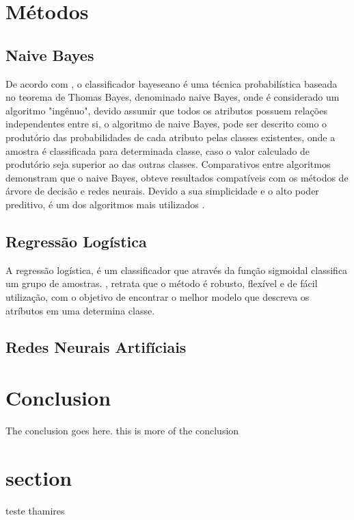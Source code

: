 \documentclass[10pt, conference, compsocconf]{IEEEtran}
\begin{document}
\section{Métodos}\label{metodos}
\subsection{Naive Bayes}
De acordo com \cite{4}, o classificador bayeseano é uma técnica probabilística baseada no teorema de Thomas Bayes, denominado naive Bayes, onde é considerado um algoritmo "ingênuo", devido assumir que todos os atributos possuem relações independentes entre si, o algoritmo de naive Bayes, pode ser descrito como o produtório das probabilidades de cada atributo pelas classes existentes, onde a amostra é classificada para determinada classe, caso o valor calculado de produtório seja superior ao das outras classes. Comparativos entre algoritmos demonstram que o naive Bayes, obteve resultados compatíveis com os métodos de árvore de decisão e redes neurais. Devido a sua simplicidade e o alto poder preditivo, é um dos algoritmos mais utilizados \cite{5}.
 
\subsection{Regressão Logística}
A regressão logística, é um classificador que através da função sigmoidal classifica um grupo de amostras. \cite{6}, retrata que o método é robusto, flexível e de fácil utilização, com o objetivo de encontrar o melhor modelo que descreva os atríbutos em uma determina classe.

\subsection{Redes Neurais Artifíciais}


\section{Conclusion}
The conclusion goes here. this is more of the conclusion


\section{section}
teste thamires

%


\end{document}
